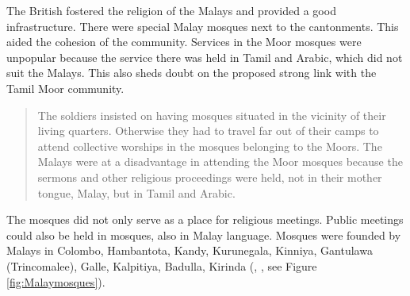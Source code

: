 The British fostered the religion of the Malays and provided a
good infrastructure. There were special Malay mosques next to the
cantonments. This aided the cohesion of the community. Services in
the Moor mosques were  unpopular because the service there was
held in Tamil and Arabic, which did not suit the Malays. This also
sheds doubt on the proposed strong link with the Tamil Moor
community.

\begin{quote}
The soldiers insisted on having mosques situated in the vicinity of their living quarters. Otherwise they had to travel far out of their camps to attend collective worships in the mosques belonging to the Moors. The Malays were at a disadvantage in attending the Moor mosques because the sermons and other religious proceedings were held, not in their mother tongue, Malay, but in Tamil and Arabic. \citep[124]{Hussainmiya1990}
\end{quote}

The mosques did not only serve as a place for religious
meetings. Public meetings could also be held in mosques, also in
Malay language. Mosques were founded  by Malays in
Colombo,
Hambantota,
Kandy,
Kurunegala,
Kinniya,
Gantulawa (Trincomalee),
Galle,
Kalpitiya,
Badulla,
Kirinda
(\citet[124]{Hussainmiya1990}, \citet[449]{Hussein2007}, see Figure \ref{fig:Malaymosques}).

